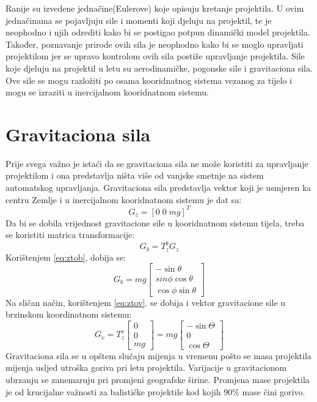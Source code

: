 Ranije su izvedene jednačine(Eulerove) koje opisuju kretanje projektila. U ovim jednačinama se 
pojavljuju sile i momenti koji djeluju na projektil, te je neophodno i njih odrediti kako bi 
se postigao potpun dinamički model projektila. Također, poznavanje prirode ovih sila je neophodno kako 
bi se moglo upravljati projektilom jer se upravo kontrolom ovih sila postiže upravljanje projektila.
Sile koje djeluju na projektil u letu su aerodinamičke, pogonske sile i 
gravitaciona sila. Ove sile se mogu razložiti po osama kooridnatnog sistema vezanog 
za tijelo i mogu se izraziti u inercijalnom kooridnatnom sistemu. 
\section{Gravitaciona sila}
Prije svega važno je istaći da se gravitaciona sila ne može koristiti za upravljanje projektilom i 
ona predstavlja ništa više od vanjske smetnje na sistem automatskog upravljanja.
Gravitaciona sila predstavlja vektor koji je usmjeren ka centru Zemlje i u inercijalnom kooridnatnom
sistemu je dat sa:
\begin{equation}
    G_{z}=[0\;  0\;  mg]^T
\end{equation}
Da bi se dobila vrijednost gravitacione sile u kooridnatnom sistemu tijela, treba se koristiti matrica 
transformacije:
\begin{equation}
    G_{b} = T_{z}^bG_{z}
\end{equation}
Korištenjem \ref{eq:ztob}, dobija se:
\begin{equation}
    G_b = mg\begin{bmatrix}
        -\sin\theta \\
        sin\phi\cos\theta \\
        \cos\phi\sin\theta
    \end{bmatrix}
\end{equation}
Na sličan način, korištenjem \ref{eq:ztov}.  se dobija i vektor gravitacione sile u brzinskom koordinatnom sistemu:
\begin{equation}
    G_v = T_{z}^v\begin{bmatrix}
        0 \\ 0 \\ mg\end{bmatrix} = mg\begin{bmatrix}
            -\sin\Theta \\ 0 \\ \cos\Theta
    \end{bmatrix}
\end{equation}
Gravitaciona sila se u opštem slučaju mijenja u vremenu pošto se masa projektila mijenja usljed utroška goriva
pri letu projektila. Varijacije u gravitacionom ubrzanju se zanemaruju pri promjeni geografske širine.  
Promjena mase projektila je od krucijalne važnosti za balističke projektile kod kojih $90\%$ mase čini gorivo.
